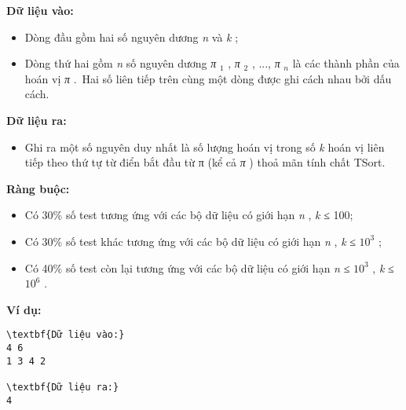\textbf{Dữ liệu vào: }
\begin{itemize}
	\item Dòng đầu gồm hai số nguyên dương \emph{ n } và \emph{ k } ;
	\item Dòng thứ hai gồm \emph{ n } số nguyên dương \emph{ π }$_ 1 $ , \emph{ π }$_ 2 $ , ..., \emph{ π }\emph{$_ n $}\emph{} là các thành phần của hoán vị \emph{ π } . Hai số liên tiếp trên cùng một dòng được ghi cách nhau bởi dấu cách.
\end{itemize}

\textbf{Dữ liệu ra: }
\begin{itemize}
	\item Ghi ra một số nguyên duy nhất là số lượng hoán vị trong số \emph{ k } hoán vị liên tiếp theo thứ tự từ điển bắt đầu từ π \emph{} (kể cả \emph{ π } ) thoả mãn tính chất TSort.
\end{itemize}

\textbf{Ràng buộc: }
\begin{itemize}
	\item Có 30\% số test tương ứng với các bộ dữ liệu có giới hạn \emph{ n } , \emph{ k } ≤ 100;
	\item Có 30\% số test khác tương ứng với các bộ dữ liệu có giới hạn \emph{ n } , \emph{ k } ≤ $10^{3}$ ;
	\item Có 40\% số test còn lại tương ứng với các bộ dữ liệu có giới hạn \emph{ n } ≤ $10^{3}$ , \emph{ k } ≤ $10^{6}$ .
\end{itemize}

\textbf{Ví dụ: }
\begin{verbatim}
\textbf{Dữ liệu vào:}
4 6
1 3 4 2

\textbf{Dữ liệu ra:}
4\end{verbatim}
